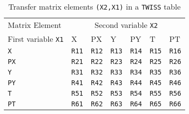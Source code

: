 \begin{table}[Ht] \footnotesize
  \begin{center}
    \caption{Transfer matrix elements \texttt{(X2,X1)} in a \texttt{TWISS} table}
    \label{tab:twiss-mat}
    \begin{tabular}{|l|l|l|l|l|l|l|}
      \hline
      Matrix Element & \multicolumn{6}{c|}{Second variable \texttt{X2}} \\
      First variable \texttt{X1} & X & PX & Y & PY & T & PT \\
      \hline
      \texttt{X} &
      \texttt{R11}\index{R11} & \texttt{R12}\index{R12} &
      \texttt{R13}\index{R13} & \texttt{R14}\index{R14} &
      \texttt{R15}\index{R15} & \texttt{R16}\index{R16} \\
      \texttt{PX} &
      \texttt{R21}\index{R21} & \texttt{R22}\index{R22} &
      \texttt{R23}\index{R23} & \texttt{R24}\index{R24} &
      \texttt{R25}\index{R25} & \texttt{R26}\index{R26} \\
      \texttt{Y} &
      \texttt{R31}\index{R31} & \texttt{R32}\index{R32} &
      \texttt{R33}\index{R33} & \texttt{R34}\index{R34} &
      \texttt{R35}\index{R35} & \texttt{R36}\index{R36} \\
      \texttt{PY} &
      \texttt{R41}\index{R41} & \texttt{R42}\index{R42} &
      \texttt{R43}\index{R43} & \texttt{R44}\index{R44} &
      \texttt{R45}\index{R45} & \texttt{R46}\index{R46} \\
      \texttt{T} &
      \texttt{R51}\index{R51} & \texttt{R52}\index{R52} &
      \texttt{R53}\index{R53} & \texttt{R54}\index{R54} &
      \texttt{R55}\index{R55} & \texttt{R56}\index{R56} \\
      \texttt{PT} &
      \texttt{R61}\index{R61} & \texttt{R62}\index{R62} &
      \texttt{R63}\index{R63} & \texttt{R64}\index{R64} &
      \texttt{R65}\index{R65} & \texttt{R66}\index{R66} \\
      \hline
    \end{tabular}
  \end{center}
\end{table}

